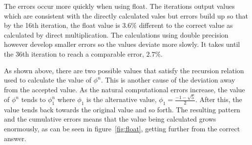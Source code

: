 \documentclass[11pt]{article} %
\begin{document}
		The errors occur more quickly when using float. The iterations output values which are consistent with the directly calculated vales but errors build up so that by the 16th iteration, the float value is $3.6\%$ different to the correct value as calculated by direct multiplication. The calculations using double precision however develop smaller errors so the values deviate more slowly. It takes until the 36th iteration to reach a comparable error, $2.7\%$.

		As shown above, there are two possible values that satisfy the recursion relation used to calculate the value of $\phi^n$. This is another cause of the deviation away from the accepted value. As the natural computational errors increase, the value of $\phi^n$ tends to $\phi_1^n$ where $\phi_1$ is the alternative value, $\phi_1 = \frac{-1-\sqrt{5}}{2}$. After this, the value tends back towards the original value and so forth. The resulting pattern and the cumulative errors means that the value being calculated grows enormously, as can be seen in figure~\ref{fig:float}, getting further from the correct answer.
		\newpage
\end{document}
